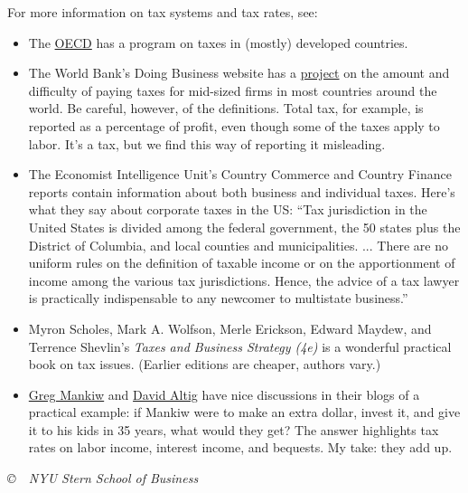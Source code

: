 \documentclass[letterpaper,12pt]{article}
\begin{document}
For more information on tax systems and tax rates, see:
%
\begin{itemize}
\item The
\href{http://www.oecd.org/topic/0,3373,en_2649_37427_1_1_1_1_37427,00.html}
{OECD}
has a program on taxes in (mostly) developed countries.

\item The World Bank's Doing Business website has a
\href{http://www.doingbusiness.org/features/taxes2009.aspx}{project}
on the amount and difficulty of paying taxes for mid-sized firms
in most countries around the world.
Be careful, however, of the definitions.
Total tax, for example, is reported as a percentage of
profit, even though some of the taxes
apply to labor.
It's a tax, but we find this way of reporting it misleading.


\item The Economist Intelligence Unit's Country Commerce
and Country Finance reports contain information about
both business and individual taxes.
Here's what they say about corporate taxes in the US:
``Tax jurisdiction in the United States is divided among the federal
government, the 50 states plus the District of Columbia,
and local counties and municipalities. ...
There are no uniform rules on the definition of taxable income or on the
apportionment of income among the various tax jurisdictions.
Hence, the advice of a tax lawyer is practically indispensable to any newcomer to multistate business.''

\item
 Myron Scholes, Mark A. Wolfson, Merle Erickson, Edward Maydew, and
 Terrence Shevlin's {\it Taxes and Business Strategy (4e)\/}
 is a wonderful practical book on tax issues.
 (Earlier editions are cheaper, authors vary.)

\item
\href{http://gregmankiw.blogspot.com/2008/10/blog-post.html}{Greg Mankiw}
and
\href{http://macroblog.typepad.com/macroblog/2008/11/saving-and-taxe.html}
{David Altig}
have nice discussions in their blogs of a practical example:
if Mankiw were to make an extra dollar, invest it, and give it to his kids
in 35 years, what would they get?
The answer highlights tax rates on labor income, interest income,
and bequests.
My take:  they add up.  

\end{itemize}

\vfill \centerline{\it \copyright \ \number\year \  NYU Stern School of Business}
\end{document}
